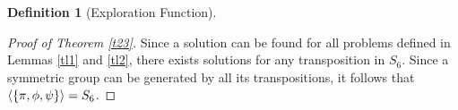 \documentclass[a4paper,twoside,12pt,openany]{report}
\theoremstyle{plain}
\theoremstyle{definition}
\newtheorem{definition}{Definition}
\newtheorem{example}{Example}
\theoremstyle{remark}
\begin{document}
\begin{definition}[Exploration Function]
\begin{proof}[Proof of Theorem \ref{t23}]
	Since a solution can be found for all problems defined in Lemmas \ref{tl1} and \ref{tl2}, there exists solutions for any transposition in \(S_6\). Since a symmetric group can be generated by all its transpositions, it follows that \(\langle\left\{ \pi,\phi,\psi \right\}\rangle=S_6\).
\end{proof}

\end{definition}
\end{document}
